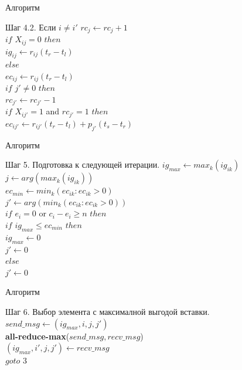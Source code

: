 \documentclass{beamer}
\begin{document}
\begin{frame}[fragile]{Алгоритм}
	\begin{block}{Шаг 4.2. Если $i \ne i'$}
		$rc_j \gets rc_j + 1$\\
		$if$ $X_{ij} = 0$ $then$\\
		\qquad$ig_{ij} \gets r_{ij} (t_r - t_l)$\\
		$else$\\
		\qquad$ec_{ij} \gets r_{ij} (t_r - t_l)$\\
		$if$ $j' \neq 0$ $then$\\
		\qquad$rc_{j'} \gets rc_{j'} - 1$\\
		\qquad$if$ $X_{ij'} = 1$ and $rc_{j'} = 1$ $then$\\
		\qquad\qquad$ec_{ij'} \gets r_{ij'} (t_r - t_l) + p_{j'} (t_s - t_r)$
	\end{block}
\end{frame}

\begin{frame}[fragile]{Алгоритм}
	\begin{block}{Шаг 5. Подготовка к следующей итерации.}
		$ig_{max} \gets max_k (ig_{ik})$\\
		$j \gets arg(max_k(ig_{ik}))$\\
		$ec_{min} \gets min_k (ec_{ik} : ec_{ik} > 0)$\\
		$j' \gets arg(min_k(ec_{ik} : ec_{ik} > 0))$\\
		$if$ $e_i = 0$ or $c_i - e_i \ge n$ $then$\\
		\qquad$if$ $ig_{max} \le ec_{min}$ $then$\\
		\qquad\qquad$ig_{max} \gets 0$\\
		\qquad\qquad$j' \gets 0$\\
		$else$\\ 
		\qquad$j' \gets 0$\\
	\end{block}
\end{frame}

\begin{frame}[fragile]{Алгоритм}	
	\begin{block}{Шаг 6. Выбор элемента с максималной выгодой вставки.}
		$send\_msg \gets (ig_{max}, i, j, j')$\\
		\textbf{all-reduce-max}($send\_msg, recv\_msg$)\\
		$(ig_{max}, i', j, j') \gets recv\_msg$\\
		$goto$ $3$
	\end{block}
\end{frame}
\end{document}
